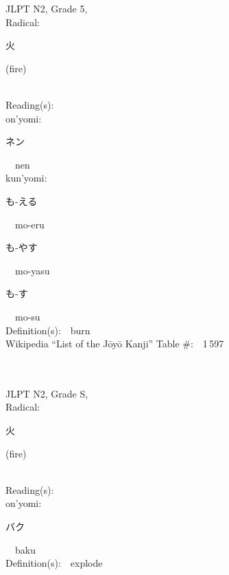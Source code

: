 \begin{multicols}{2}
{JLPT N2, Grade 5, \\Radical:\ \ {\begin{CJK}{UTF8}{min} 火 \end{CJK}} (fire) } \\
Reading(s):\ \ \\
{\hspace*{1em}}on'yomi:\ \ \\
{\hspace*{2em}}{\begin{CJK}{UTF8}{min} ネン \end{CJK}}\ \ nen\ \ \\
{\hspace*{1em}}kun'yomi:\ \ \\
{\hspace*{2em}}{\begin{CJK}{UTF8}{min} も-える \end{CJK}}\ \ mo-eru\ \ \\
{\hspace*{2em}}{\begin{CJK}{UTF8}{min} も-やす \end{CJK}}\ \ mo-yasu\ \ \\
{\hspace*{2em}}{\begin{CJK}{UTF8}{min} も-す \end{CJK}}\ \ mo-su\ \ \\
Definition(s):\ \ burn \\
Wikipedia ``List of the J\=oy\=o Kanji'' Table \#:\ \ 1\,597 \\
\ \ \\
{\fontsize{34pt}{40pt}  }\ \ \\  %
{JLPT N2, Grade S, \\Radical:\ \ {\begin{CJK}{UTF8}{min} 火 \end{CJK}} (fire) } \\
Reading(s):\ \ \\
{\hspace*{1em}}on'yomi:\ \ \\
{\hspace*{2em}}{\begin{CJK}{UTF8}{min} バク \end{CJK}}\ \ baku\ \ \\
Definition(s):\ \ explode \\

\end{multicols}
